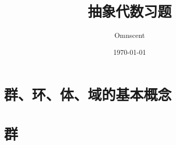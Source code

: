 \documentclass[a4paper,UTF8]{article}  %
\title{抽象代数习题}
\author{Omnscent}
\date{\today}
\begin{document}
\maketitle
\section{群、环、体、域的基本概念}
\addtocounter{subsection}{-1}




\section{群}





\end{document}
